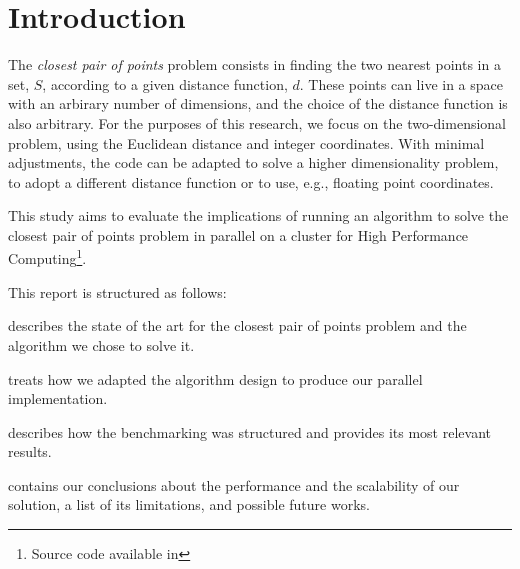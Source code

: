 \section{Introduction}
\label{sec:introduction}

The \textit{closest pair of points} problem consists
in finding the two nearest points in a set, $S$, according to a given distance function, $d$\cite{closest_pair_definition}.
These points can live in a space with an arbirary number of dimensions,
and the choice of the distance function is also arbitrary.
For the purposes of this research, we focus on the two-dimensional problem, using the Euclidean distance and integer coordinates.
With minimal adjustments, the code can be adapted to solve a higher dimensionality problem, to adopt a different distance function or to use, e.g., floating point coordinates.

This study aims to evaluate the implications of running an algorithm to solve the closest pair of points problem in parallel on a cluster for High Performance Computing\footnote{Source code available in }.

This report is structured as follows:
\begin{inlinelist}
    \item {} describes the state of the art for the closest pair of points problem and the algorithm we chose to solve it.
    \item {} treats how we adapted the algorithm design to produce our parallel implementation.
    \item {} describes how the benchmarking was structured and
    provides its most relevant results.
    \item {} contains our conclusions about the performance and the scalability of our solution, a list of its limitations, and possible future works.
\end{inlinelist}
